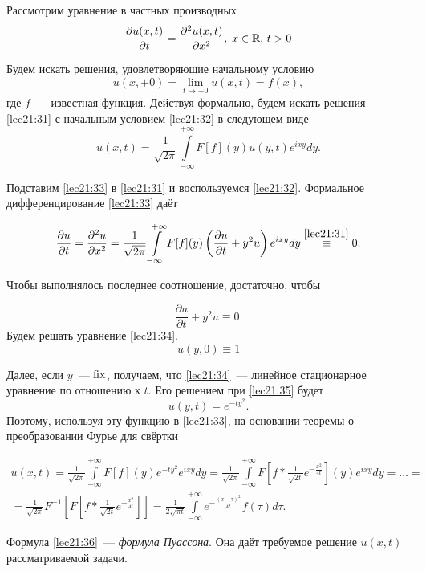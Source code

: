 \documentclass[../../main.tex]{subfiles}
\newcommand{\intii}{\int\limits_{-\infty}^{+\infty}}
\begin{document}
\begin{example}
Рассмотрим уравнение в частных производных
\begin{equation}
\label{lec21:31}
\frac{\partial u(x,t)}{\partial t} = \frac{\partial^2 u(x,t)}{\partial x^2}, 
\; x\in \mathbb{R}, \, t > 0
\end{equation}

Будем искать решения, удовлетворяющие начальному условию
\begin{equation}
  \label{lec21:32}
  u(x,+0) = \lim_{t\to+0} u(x,t) = f(x),
\end{equation}
где $f$~--- известная функция.
Действуя формально, будем искать решения \eqref{lec21:31}  с начальным 
условием \eqref{lec21:32} в следующем виде
\begin{equation}
  \label{lec21:33}
  u(x, t) = \frac{1}{\sqrt{2\pi}} \intii F[f](y)u(y,t)e^{ixy}dy.
\end{equation}

Подставим \eqref{lec21:33} в \eqref{lec21:31} и воспользуемся \eqref{lec21:32}. 
Формальное дифференцирование \eqref{lec21:33} даёт

\[\frac{\partial u}{\partial t} = \frac{\partial^2 u}{\partial x^2} = 
\frac{1}{\sqrt{2\pi}} \intii F[f](y)\left(\frac{\partial u}{\partial t} + 
y^2u\right)e^{ixy}dy \stackrel{\eqref{lec21:31}}{\equiv} 0.\]

Чтобы выполнялось последнее соотношение, достаточно, чтобы

\begin{equation}
\label{lec21:34}
\frac{\partial u}{\partial t} + y^2u \equiv 0.
\end{equation}
Будем решать уравнение \eqref{lec21:34}.
\begin{equation}
\label{lec21:35}
u(y,0) \equiv 1
\end{equation}

Далее, если $y$~--- $\operatorname{fix}$, получаем, что \eqref{lec21:34}~--- линейное 
стационарное уравнение по отношению к $t$. Его решением при \eqref{lec21:35} 
будет
\[u(y,t) = e^{-ty^2}.\]
Поэтому, используя эту функцию в \eqref{lec21:33}, на основании теоремы 
о преобразовании Фурье для свёртки

\begin{multline}
  \label{lec21:36}
  u(x,t) = \frac{1}{\sqrt{2\pi}} \intii F[f](y)e^{-ty^2}e^{ixy}dy =
  \frac{1}{\sqrt{2\pi}} \intii F\left[f * \frac{1}{\sqrt{2t}}e^{-\frac{x^2}{4t}}
  \right](y)e^{ixy}dy = \ldots =\\= \frac{1}{\sqrt{2\pi}} 
  F^{-1}\left[F\left[f*\frac{1}{\sqrt{2t}}e^{-\frac{x^2}{4t}}\right]\right] =
  \frac{1}{2\sqrt{\pi t}} \intii e^{-\frac{(x-\tau)^2}{4t}}f(\tau)d\tau.
\end{multline}

Формула \eqref{lec21:36}~--- \emph{формула Пуассона}. Она даёт требуемое 
решение $u(x,t)$ рассматриваемой задачи.
\end{example}
\end{document}
